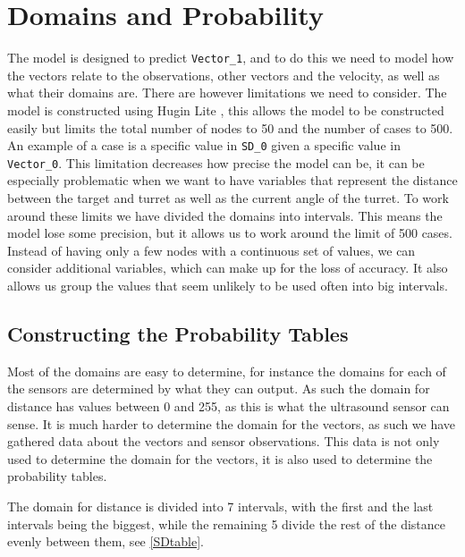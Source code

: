 \section{Domains and Probability}

The model is designed to predict \texttt{Vector\_1}, and to do this we need to
model how the vectors relate to the observations, other vectors and the
velocity, as well as what their domains are. There are however limitations we
need to consider. The model is constructed using Hugin Lite \citep{Hugin}, this
allows the model to be constructed easily but limits the total number of nodes
to 50 and the number of cases to 500. An example of a case is a specific
value in \texttt{SD\_0} given a specific value in \texttt{Vector\_0}. This
limitation decreases how precise the model can be, it can be especially problematic when we want to
have variables that represent the distance between the target and turret as
well as the current angle of the turret. To work around these limits we have
divided the domains into intervals. This means the model lose some precision,
but it allows us to work around the limit of 500 cases. Instead of having
only a few nodes with a continuous set of values, we can consider additional
variables, which can  make up for the loss of accuracy. It also allows us group
the values that seem unlikely to be used often into big intervals.

\subsection{Constructing the Probability Tables}

Most of the domains are easy to determine, for instance the domains for each of
the sensors are determined by what they can output. As such the domain for
distance has values between 0 and 255, as this is what the ultrasound sensor
can sense. It is much harder to determine the domain for the vectors, as such we
have gathered data about the vectors and sensor observations. This data is not
only used to determine the domain for the vectors, it is also used to determine
the probability tables.\nl

The domain for distance is divided into 7 intervals, with the first and the last
intervals being the biggest, while the remaining 5 divide the rest of the
distance evenly between them, see \autoref{SDtable}.

